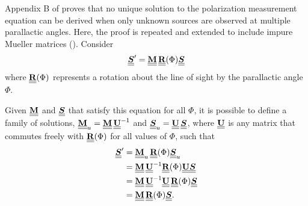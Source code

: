 Appendix B of \cite{van04c} proves that no unique solution to the polarization measurement equation can be derived when only unknown sources are observed at multiple parallactic angles.  Here, the proof is repeated and extended to include impure Mueller matrices ().
%
Consider  
\begin{equation}
\Sv{S}' = \MM{M} \, \MM{R}(\Phi) \Sv{S}
\label{eqn:parallactic_measurement_equation}
\end{equation}
where $\MM{R}(\Phi)$ represents a rotation about the line of sight by the parallactic angle $\Phi$.

Given $\MM{M}$ and $\Sv{S}$ that satisfy this equation for all $\Phi$, 
it is possible to define a family of solutions, $\MM{M}_u = \MM{M} \, \MM{U}^{-1}$ and $\Sv{S}_u = \MM{U} \, \Sv{S}$,
where $\MM{U}$ is any matrix that commutes freely with $\MM{R}(\Phi)$ for all values of $\Phi$,
%
such that
\begin{equation} \begin{split}
\Sv{S}' & = \MM{M}_u \, \MM{R}(\Phi) \Sv{S}_u \\
 & = \MM{M} \, \MM{U}^{-1} \MM{R}(\Phi) \MM{U} \Sv{S}  \\
 & = \MM{M} \, \MM{U}^{-1}  \MM{U} \, \MM{R}(\Phi) \Sv{S}  \\
 & = \MM{M} \, \MM{R}(\Phi) \Sv{S}.
\end{split} \end{equation}
%

